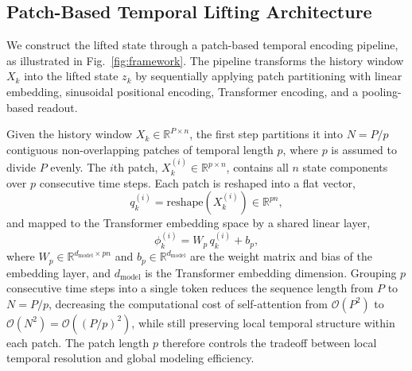 \documentclass[journal]{IEEEtran}
\begin{document}
\subsection{Patch-Based Temporal Lifting Architecture}
\label{sec:temporal_lifting}

We construct the lifted state through a patch-based temporal encoding pipeline, as illustrated in Fig.~\ref{fig:framework}. The pipeline transforms the history window $X_k$ into the lifted state $z_k$ by sequentially applying patch partitioning with linear embedding, sinusoidal positional encoding, Transformer encoding, and a pooling-based readout.

Given the history window $X_k \in \mathbb{R}^{P \times n}$, the first step partitions it into $N = P/p$ contiguous non-overlapping patches of temporal length $p$, where $p$ is assumed to divide $P$ evenly. The $i$th patch, $X_k^{(i)} \in \mathbb{R}^{p \times n}$, contains all $n$ state components over $p$ consecutive time steps. Each patch is reshaped into a flat vector,
\begin{equation}
    q_k^{(i)} = \mathrm{reshape}(X_k^{(i)}) \in \mathbb{R}^{pn},
    \label{eq:patch_reshape}
\end{equation}
and mapped to the Transformer embedding space by a shared linear layer,
\begin{equation}
    \phi_k^{(i)} = W_p\, q_k^{(i)} + b_p,
    \label{eq:patch_embedding}
\end{equation}
where $W_p \in \mathbb{R}^{d_{\mathrm{model}} \times pn}$ and $b_p \in \mathbb{R}^{d_{\mathrm{model}}}$ are the weight matrix and bias of the embedding layer, and $d_{\mathrm{model}}$ is the Transformer embedding dimension. Grouping $p$ consecutive time steps into a single token reduces the sequence length from $P$ to $N = P/p$, decreasing the computational cost of self-attention from $\mathcal{O}(P^2)$ to $\mathcal{O}(N^2) = \mathcal{O}((P/p)^2)$, while still preserving local temporal structure within each patch. The patch length $p$ therefore controls the tradeoff between local temporal resolution and global modeling efficiency.
\end{document}
